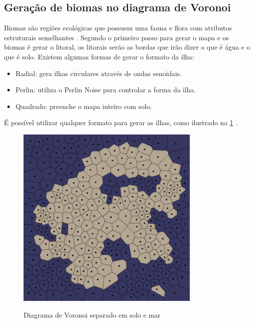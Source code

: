 \subsection{Geração de biomas no diagrama de Voronoi}

Biomas são regiões ecológicas que possuem uma fauna e flora com atributos estruturais semelhantes \space\cite{maestrovirtuale}. Segundo \space{} o primeiro passo para gerar o mapa e os biomas é gerar o litoral, os litorais serão as bordas que irão dizer o que é água e o que é solo. Existem algumas formas de gerar o formato da ilha:

\begin{itemize}
    \item Radial: gera ilhas circulares através de ondas senoidais.
    \item Perlin: utiliza o Perlin Noise para controlar a forma da ilha.
    \item Quadrado: preenche o mapa inteiro com solo.
\end{itemize}

É possível utilizar qualquer formato para gerar as ilhas, como ilustrado na \cref{fig:voronoi-land-water} \space\cite{amitp2010}.

\begin{figure}[ht]
	\caption{Diagrama de Voronoi separado em solo e mar}
	\centering %
	\includegraphics[width=0.8\textwidth]{figures/voronoi-land-water.png} %
	\label{fig:voronoi-land-water}
\end{figure}

